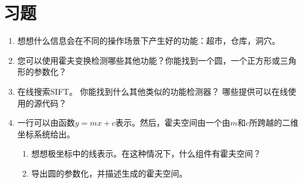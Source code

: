 \section*{习题}\small
\begin{enumerate}

\item 想想什么信息会在不同的操作场景下产生好的功能：超市，仓库，洞穴。
\item 您可以使用霍夫变换检测哪些其他功能？你能找到一个圆，一个正方形或三角形的参数化？
\item 在线搜索SIFT。 你能找到什么其他类似的功能检测器？ 哪些提供可以在线使用的源代码？
\item 一行可以由函数$ y = mx + c $表示。然后，霍夫空间由一个由$ m $和$ c $所跨越的二维坐标系统给出。
\begin{enumerate}

\item 想想极坐标中的线表示。在这种情况下，什么组件有霍夫空间？
\item 导出圆的参数化，并描述生成的霍夫空间。
\end{enumerate}
\end{enumerate}
\normalsize